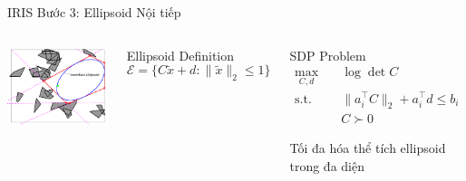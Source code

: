 \documentclass[aspectratio=169]{beamer}
\begin{document}
\begin{frame}{IRIS Bước 3: Ellipsoid Nội tiếp}
    \begin{columns}[c]
        \includegraphics[width=\textwidth]{imgs/iris_2.png}

        \begin{block}{Ellipsoid Definition}
            \small
            \[
                \mathcal{E} = \{C\tilde{x} + d : \|\tilde{x}\|_2 \leq 1\}
            \]
        \end{block}

        \begin{block}{SDP Problem}
            \small
            \[
                \begin{aligned}
                    \max_{C,d} \quad  & \log \det C                            \\
                    \text{s.t.} \quad & \|a_i^\top C\|_2 + a_i^\top d \leq b_i \\
                                      & C \succ 0
                \end{aligned}
            \]

            Tối đa hóa thể tích ellipsoid trong đa diện
        \end{block}
    \end{columns}
\end{frame}
\end{document}
